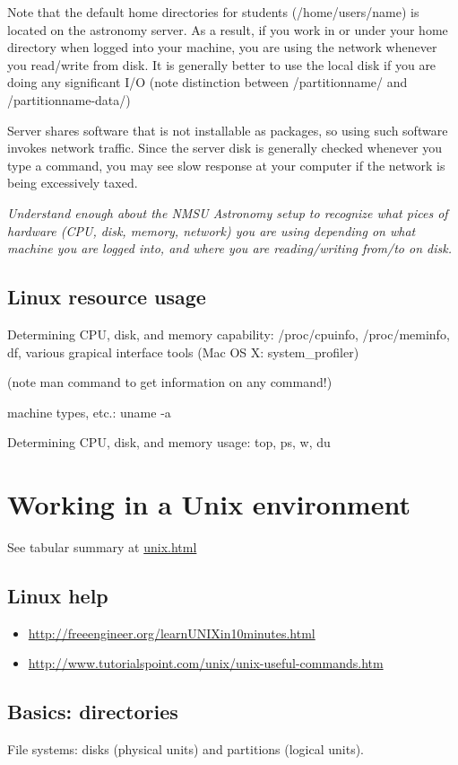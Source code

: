 \documentclass{article}
\newcommand{\test}[1]{%
    \begin{center}
        \colorbox{hl}{\parbox{0.9\textwidth}{\emph{\centering #1}}}
    \end{center}}
\begin{document}
Note that the default home directories for students (/home/users/name)
is located on the astronomy server. As a result, if you work in or
under your home directory when logged into your machine, you are using
the network whenever you read/write from disk. It is generally better
to use the local disk if you are doing any significant I/O (note
distinction between /partitionname/ and /partitionname-data/)

Server shares software that is not installable as packages, so using
such software invokes network traffic. Since the server disk is
generally checked whenever you type a command, you may see slow
response at your computer if the network is being excessively taxed.

\test{Understand enough about the NMSU Astronomy setup to recognize
what pices of hardware (CPU, disk, memory, network) you are using
depending on what machine you are logged into, and where you are
reading/writing from/to on disk.}

\subsection{Linux resource usage}
Determining CPU, disk, and memory capability: /proc/cpuinfo,
/proc/meminfo, df, various grapical interface tools (Mac OS X:
system\_profiler)

(note man command to get information on any command!)

machine types, etc.: uname -a

Determining CPU, disk, and memory usage: top, ps, w, du

\section{Working in a Unix environment}
See tabular summary at \url{unix.html}

\subsection{Linux help}
\begin{itemize}
    \item \url{http://freeengineer.org/learnUNIXin10minutes.html}
    \item \url{http://www.tutorialspoint.com/unix/unix-useful-commands.htm}
\end{itemize}

\subsection{Basics: directories}
File systems: disks (physical units) and partitions (logical units).
\end{document}
